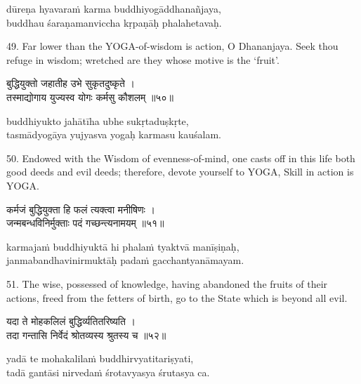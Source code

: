 \begin{transliteration}
dūreṇa hyavaraṁ karma buddhiyogāddhanañjaya, \\
buddhau śaraṇamanviccha kṛpaṇāḥ phalahetavaḥ.
\end{transliteration}

49. Far lower than the YOGA-of-wisdom is action, O Dhananjaya. Seek thou refuge
in wisdom; wretched are they whose motive is the `fruit'.

\begin{gitaverse}
बुद्धियुक्तो जहातीह उभे सुकृतदुष्कृते । \\
तस्माद्योगाय युज्यस्व योगः कर्मसु कौशलम् ॥५०॥
\end{gitaverse}

\begin{transliteration}
buddhiyukto jahātīha ubhe sukṛtaduṣkṛte, \\
tasmādyogāya yujyasva yogaḥ karmasu kauśalam.
\end{transliteration}

50. Endowed with the Wisdom of evenness-of-mind, one casts off in this life
both good deeds and evil deeds; therefore, devote yourself to YOGA, Skill in
action is YOGA.\@

\begin{gitaverse}
कर्मजं बुद्धियुक्ता हि फलं त्यक्त्वा मनीषिणः । \\
जन्मबन्धविनिर्मुक्ताः पदं गच्छन्त्यनामयम् ॥५१॥
\end{gitaverse}

\begin{transliteration}
karmajaṁ buddhiyuktā hi phalaṁ tyaktvā manīṣiṇaḥ, \\
janmabandhavinirmuktāḥ padaṁ gacchantyanāmayam.
\end{transliteration}

51. The wise, possessed of knowledge, having abandoned the fruits of their
actions, freed from the fetters of birth, go to the State which is beyond all
evil.

\begin{gitaverse}
यदा ते मोहकलिलं बुद्धिर्व्यतितरिष्यति । \\
तदा गन्तासि निर्वेदं श्रोतव्यस्य श्रुतस्य च ॥५२॥
\end{gitaverse}

\begin{transliteration}
yadā te mohakalilaṁ buddhirvyatitariṣyati, \\
tadā gantāsi nirvedaṁ śrotavyasya śrutasya ca.
\end{transliteration}

